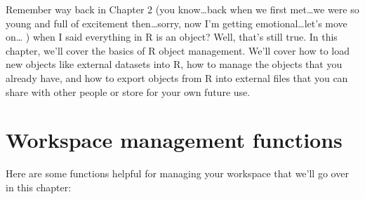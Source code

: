 \documentclass[]{book}
\theoremstyle{definition}
\theoremstyle{definition}
\theoremstyle{remark}
\begin{document}
Remember way back in Chapter 2 (you know\ldots{}back when we first
met\ldots{}we were so young and full of excitement then\ldots{}sorry,
now I'm getting emotional\ldots{}let's move on\ldots{} ) when I said
everything in R is an object? Well, that's still true. In this chapter,
we'll cover the basics of R object management. We'll cover how to load
new objects like external datasets into R, how to manage the objects
that you already have, and how to export objects from R into external
files that you can share with other people or store for your own future
use.

\section{Workspace management
functions}\label{workspace-management-functions}

Here are some functions helpful for managing your workspace that we'll
go over in this chapter:
\end{document}
